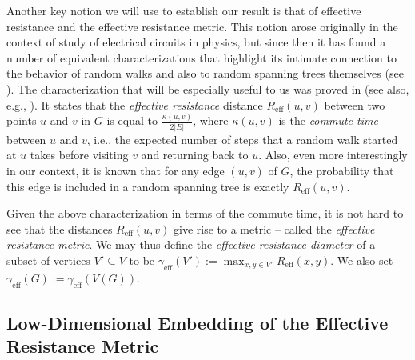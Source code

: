 \documentclass[11pt, letterpaper]{article}
\newcommand{\Reff}{R_{\mathrm{eff}}}
\newcommand{\diameff}{\gamma_{\mathrm{eff}}}
\begin{document}
Another key notion we will use to establish our result is that of effective resistance and the effective resistance metric. This notion arose originally in the context of study of electrical circuits in physics, but since then it has found a number of equivalent characterizations that highlight its intimate connection to the behavior of random walks and also to random spanning trees themselves (see \cite{DoyleS84,Bollobas98,LyonsP13,Lovasz93}). The characterization that will be especially useful to us was proved in \cite{ChandraRRS89} (see also, e.g., \cite{Lovasz93}). It states that the {\em effective resistance} distance $\Reff(u,v)$ between two points $u$ and $v$ in $G$ is equal to $\frac{\kappa(u,v)}{2 |E|}$, where $\kappa(u,v)$ is the {\em commute time} between $u$ and $v$, i.e., the expected number of steps that a random walk started at $u$ takes before visiting $v$ and returning back to $u$.  Also, even more interestingly in our context, it is known that for any edge $(u,v)$ of $G$, the probability that this edge is included in a random spanning tree is exactly $\Reff(u,v)$. 

Given the above characterization in terms of the commute time, it is not hard to see that the distances $\Reff(u,v)$ give rise to a metric -- called the {\em effective resistance metric}. We may thus define the {\em effective resistance diameter} of a subset of vertices $V' \subseteq V$ to be $\diameff(V') := \max_{x,y \in V'} \Reff(x,y)$. We also set $\diameff(G):= \diameff(V(G))$.




\subsection{Low-Dimensional Embedding of the Effective Resistance Metric} \label{sec:reff_embedding}
\end{document}

